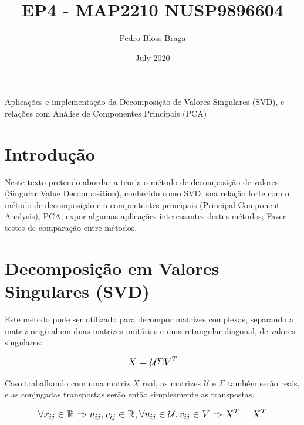 \documentclass{article}
\title{EP4 - MAP2210 NUSP9896604}
\author{Pedro Blöss Braga}
\date{July 2020}
\begin{document}
\maketitle

\hfill

\hfill


\begin{center}
{\huge Aplicações e implementação da 
Decomposição de Valores Singulares (SVD),
e relações com Análise de Componentes Principais (PCA) }    
\end{center}

\pagebreak

\tableofcontents


\pagebreak

\section{Introdução}

\hfill

Neste texto pretendo abordar a teoria o método de decomposição de valores (Singular Value Decomposition), conhecido como SVD; sua relação forte com o método de decomposição em compontentes principais (Principal Component Analysis), PCA; expor algumas aplicações interessantes destes métodos; Fazer testes de comparação entre métodos.


\pagebreak

\section{Decomposição em Valores Singulares (SVD)}

\hfill

Este método pode ser utilizado para decompor matrizes complexas, separando a matriz original em duas matrizes unitárias e uma retangular diagonal, de valores singulares:

\begin{equation}
\mathlarger{
X = \mathcal{U} \Sigma V^T
}
\end{equation}


Caso trabalhando com uma matriz $X$ real, as matrizes $\mathcal{U}$ e $\Sigma$ também serão reais, e as conjugadas transpostas serão então simplesmente as transpostas.

\begin{equation}
\mathlarger{
\forall x_{ij} \in \mathbb{R} \Rightarrow u_{ij}, v_{ij} \in \mathbb{R}, \forall u_{ij} \in \mathcal{U}, v_{ij} \in V \Rightarrow \bar{X}^T = X^T
}
\end{equation}
\end{document}
